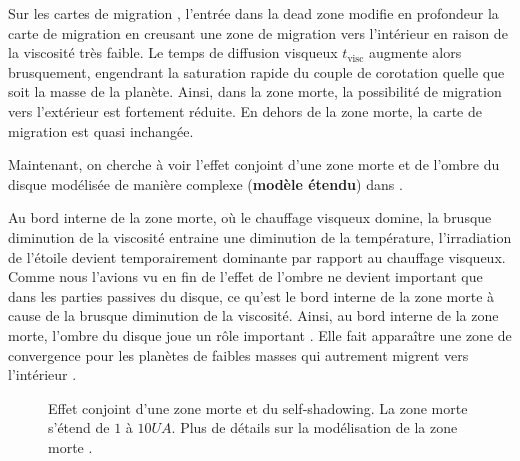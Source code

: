 Sur les cartes de migration , l'entrée dans la dead zone modifie en profondeur la carte de migration en creusant une zone de migration vers l'intérieur en raison de la viscosité très faible. Le temps de diffusion visqueux $t_\text{visc}$ augmente alors brusquement, engendrant la saturation rapide du couple de corotation quelle que soit la masse de la planète. Ainsi, dans la zone morte, la possibilité de migration vers l'extérieur est fortement réduite. En dehors de la zone morte, la carte de migration est quasi inchangée.

\bigskip

Maintenant, on cherche à voir l'effet conjoint d'une zone morte et de l'ombre du disque modélisée de manière complexe (\textbf{modèle étendu}) dans .

Au bord interne de la zone morte, où le chauffage visqueux domine, la brusque diminution de la viscosité entraine une diminution de la température, l'irradiation de l'étoile devient temporairement dominante par rapport au chauffage visqueux. Comme nous l'avions vu en fin de  l'effet de l'ombre ne devient important que dans les parties passives du disque, ce qu'est le bord interne de la zone morte à cause de la brusque diminution de la viscosité. Ainsi, au bord interne de la zone morte, l'ombre du disque joue un rôle important . Elle fait apparaître une zone de convergence pour les planètes de faibles masses qui autrement migrent vers l'intérieur .

\begin{figure}[htbp]
\centering
{}\hfill
{}

\caption[Effets conjoint d'une zone morte et du self-shadowing sur la carte de migration.]{Effet conjoint d'une zone morte et du
\og self-shadowing\fg. La zone morte s'étend de $1$ à $10\unit{UA}$. Plus de détails sur la modélisation de la zone morte
\protect{}. }\label{fig:dz_shadow}
\end{figure}

